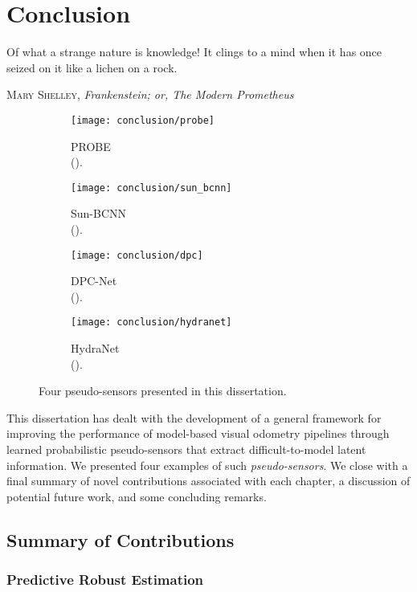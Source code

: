 \chapter{Conclusion}
\epigraph{Of what a strange nature is knowledge! It clings to a mind when it has once seized on it like a lichen on a rock.}{\textsc{Mary Shelley}, \textit{Frankenstein; or, The Modern Prometheus}}

\begin{figure}
\begin{subfigure}[]{0.24\textwidth}
    \texttt{[image: conclusion/probe]}
  \caption{PROBE \\ ().}
\end{subfigure}
\begin{subfigure}[]{0.24\textwidth}
    \texttt{[image: conclusion/sun\_bcnn]}
  \caption{Sun-BCNN \\ ().}
\end{subfigure}
\begin{subfigure}[]{0.24\textwidth}
    \texttt{[image: conclusion/dpc]}
  \caption{DPC-Net \\ ().}
\end{subfigure}
\begin{subfigure}[]{0.22\textwidth}
    \texttt{[image: conclusion/hydranet]}
  \caption{HydraNet \\ ().}
\end{subfigure}
\caption{Four pseudo-sensors presented in this dissertation.}
\end{figure}

This dissertation has dealt with the development of a general framework for improving the performance of model-based visual odometry pipelines through learned probabilistic pseudo-sensors that extract difficult-to-model latent information.  We presented four examples of such \textit{pseudo-sensors}. We close with a final summary of novel contributions associated with each chapter, a discussion of potential future work, and some concluding remarks.

\section{Summary of Contributions}

\subsection{Predictive Robust Estimation}

